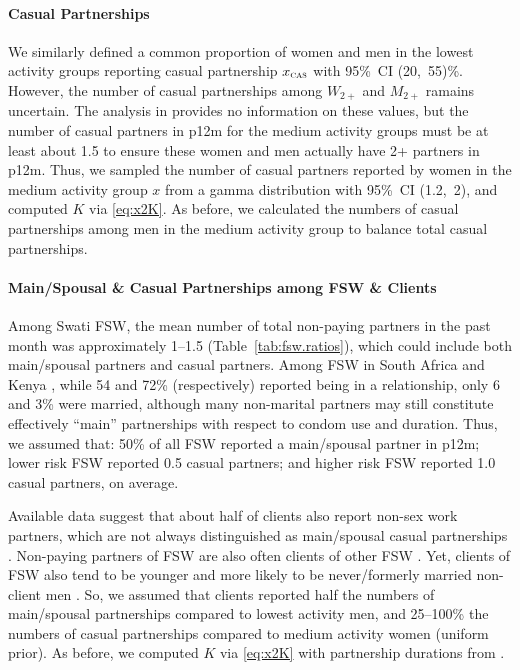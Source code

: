 \paragraph{Casual Partnerships}
We similarly defined a common proportion of women and men in the lowest activity groups
reporting casual partnership $x_{\textsc{cas}}$ with 95\%~CI (20,~55)\%.
However, the number of casual partnerships among $W_{2+}$ and $M_{2+}$ ramains uncertain.
The analysis in  provides no information on these values,
but the number of casual partners in p12m
for the medium activity groups must be at least about 1.5
to ensure these women and men actually have 2+ partners in p12m.
Thus, we sampled the number of casual partners
reported by women in the medium activity group $x$
from a gamma distribution with 95\%~CI (1.2,~2),
and computed $K$ via \eqref{eq:x2K}.
As before, we calculated the numbers of casual partnerships
among men in the medium activity group to balance total casual partnerships.
\paragraph{Main/Spousal \& Casual Partnerships among FSW \& Clients}
Among Swati FSW, the mean number of total non-paying partners in the past month was
approximately 1--1.5 (Table~\ref{tab:fsw.ratios}),
which could include both main/spousal partners and casual partners.
Among FSW in South Africa \cite{Wells2018} and Kenya \cite{Voeten2007},
while 54 and 72\% (respectively) reported being in a relationship, only 6 and 3\% were married,
although many non-marital partners may still constitute effectively ``main'' partnerships
with respect to condom use and duration.
Thus, we assumed that:
50\% of all FSW reported a main/spousal partner in p12m;
lower risk FSW reported 0.5 casual partners; and
higher risk FSW reported 1.0 casual partners, on average.
\par
Available data suggest that about half of clients also report non-sex work partners,
which are not always distinguished as main/spousal \vs casual partnerships
\cite{Lowndes2000,Santo2005}.
Non-paying partners of FSW are also often clients of other FSW \cite{Voeten2007,Godin2008}.
Yet, clients of FSW also tend to be younger and more likely to be
never/formerly married \vs non-client men \cite{Lowndes2000,Carael2006}.
So, we assumed that clients reported
half the numbers of main/spousal partnerships compared to lowest activity men, and
25--100\% the numbers of casual partnerships compared to medium activity women (uniform prior).
As before, we computed $K$ via \eqref{eq:x2K}
with partnership durations from .
